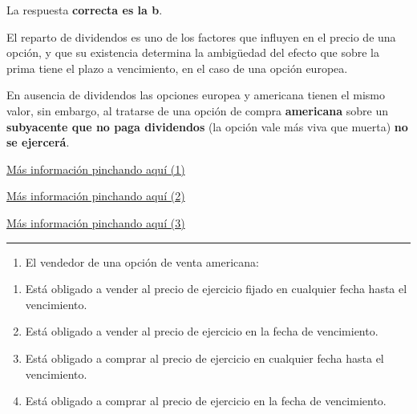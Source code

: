 \documentclass[
  letterpaper,
  DIV=11,
  numbers=noendperiod]{scrreprt}
\providecommand{\tightlist}{%
  \setlength{\itemsep}{0pt}\setlength{\parskip}{0pt}}\usepackage{longtable,booktabs,array}
\begin{document}
\begin{tcolorbox}[enhanced jigsaw, left=2mm, opacityback=0, colback=white, breakable, arc=.35mm, bottomrule=.15mm, rightrule=.15mm, toprule=.15mm, leftrule=.75mm, colframe=quarto-callout-tip-color-frame]
\begin{minipage}[t]{5.5mm}
\textcolor{quarto-callout-tip-color}{\faLightbulb}
\end{minipage}%
\begin{minipage}[t]{\textwidth - 5.5mm}

La respuesta \textbf{correcta es la b}.

El reparto de dividendos es uno de los factores que influyen en el
precio de una opción, y que su existencia determina la ambigüedad del
efecto que sobre la prima tiene el plazo a vencimiento, en el caso de
una opción europea.

En ausencia de dividendos las opciones europea y americana tienen el
mismo valor, sin embargo, al tratarse de una opción de compra
\textbf{americana} sobre un \textbf{subyacente que no paga dividendos}
(la opción vale más viva que muerta) \textbf{no se ejercerá}.

\href{https://ddd.uab.cat/pub/ree/02101025v15n2/02101025v15n2p199.pdf}{Más
información pinchando aquí (1)}

\href{https://www.enciclopediafinanciera.com/manual/opciones-americanas.html}{Más
información pinchando aquí (2)}

\href{https://m.riunet.upv.es/bitstream/handle/10251/107084/Cort\%C3\%A9s\%3BBurgos\%3BNavarro\%20-\%20Relaci\%C3\%B3n\%20entre\%20los\%20precios\%20de\%20Opciones\%20Europeas\%20y\%20de\%20Opciones\%20Americanas\%20....pdf?sequence=1\&isAllowed=y}{Más
información pinchando aquí (3)}

\end{minipage}%
\end{tcolorbox}

\begin{center}\rule{0.5\linewidth}{0.5pt}\end{center}

\begin{enumerate}
\def\labelenumi{\arabic{enumi}.}
\setcounter{enumi}{59}
\tightlist
\item
  El vendedor de una opción de venta americana:
\end{enumerate}

\begin{enumerate}
\def\labelenumi{\alph{enumi})}
\item
  Está obligado a vender al precio de ejercicio fijado en cualquier
  fecha hasta el vencimiento.
\item
  Está obligado a vender al precio de ejercicio en la fecha de
  vencimiento.
\item
  Está obligado a comprar al precio de ejercicio en cualquier fecha
  hasta el vencimiento.
\item
  Está obligado a comprar al precio de ejercicio en la fecha de
  vencimiento.
\end{enumerate}
\end{document}
